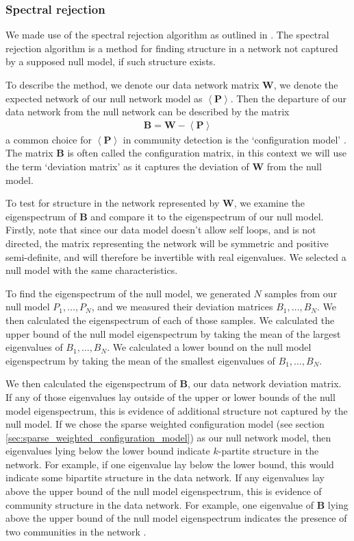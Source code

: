         \subsubsection{Spectral rejection}\label{sec:spectral_rejection}
        We made use of the spectral rejection algorithm as outlined in  \parencite{humphries}. The spectral rejection algorithm is a method for finding structure in a network not captured by a supposed null model, if such structure exists.

        To describe the method, we denote our data network matrix $\mathbf{W}$, we denote the expected network of our null network model as $\left\langle \mathbf{P} \right\rangle$. Then the departure of our data network from the null network can be described by the matrix
        \begin{align}
          \mathbf{B} = \mathbf{W} - \left\langle \mathbf{P} \right\rangle
        \end{align}
        a common choice for $\left\langle \mathbf{P} \right\rangle$ in community detection is the `configuration model'  \parencite{fosdick, humphries2}. The matrix $\mathbf{B}$ is often called the configuration matrix, in this context we will use the term `deviation matrix' as it captures the deviation of $\mathbf{W}$ from the null model.

        To test for structure in the network represented by $\mathbf{W}$, we examine the eigenspectrum of $\mathbf{B}$ and compare it to the eigenspectrum of our null model. Firstly, note that since our data model doesn't allow self loops, and is not directed, the matrix representing the network will be symmetric and positive semi-definite, and will therefore be invertible with real eigenvalues. We selected a null model with the same characteristics.

        To find the eigenspectrum of the null model, we generated $N$ samples from our null model $P_1, \dots, P_N$, and we measured their deviation matrices $B_1, \dots, B_N$. We then calculated the eigenspectrum of each of those samples. We calculated the upper bound of the null model eigenspectrum by taking the mean of the largest eigenvalues of $B_1, \dots, B_N$. We calculated a lower bound on the null model eigenspectrum by taking the mean of the smallest eigenvalues of $B_1, \dots, B_N$.

        We then calculated the eigenspectrum of $\mathbf{B}$, our data network deviation matrix. If any of those eigenvalues lay outside of the upper or lower bounds of the null model eigenspectrum, this is evidence of additional structure not captured by the null model. If we chose the sparse weighted configuration model (see section \ref{sec:sparse_weighted_configuration_model}) as our null network model, then eigenvalues lying below the lower bound indicate $k$-partite structure in the network. For example, if one eigenvalue lay below the lower bound, this would indicate some bipartite structure in the data network. If any eigenvalues lay above the upper bound of the null model eigenspectrum, this is evidence of community structure in the data network. For example, one eigenvalue of $\mathbf{B}$ lying above the upper bound of the null model eigenspectrum indicates the presence of two communities in the network  \parencite{humphries2}.

